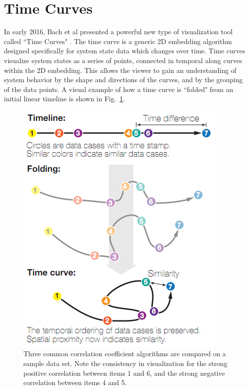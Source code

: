\section{Time Curves}

In early 2016, Bach et al presented a powerful new type of visualization tool called ``Time Curves" \cite{bach2016time}. The time curve is a generic 2D embedding algorithm designed specifically for system state data which changes over time. Time curves visualize system states as a series of points, connected in temporal along curves within the 2D embedding. This allows the viewer to gain an understanding of system behavior by the shape and directions of the curves, and by the grouping of the data points. A visual example of how a time curve is ``folded" from an initial linear timeline is shown in Fig.~\ref{fig:time_curve_example}.

\begin{figure}[h]
\centering
    \includegraphics[width=\columnwidth]{images/time_curve_example.png}
    \caption{Three common correlation coefficient algorithms are compared on a sample data set. Note the consistency in visualization for the strong positive correlation between items 1 and 6, and the strong negative correlation between items 4 and 5.}
    \label{fig:time_curve_example}
\end{figure}


